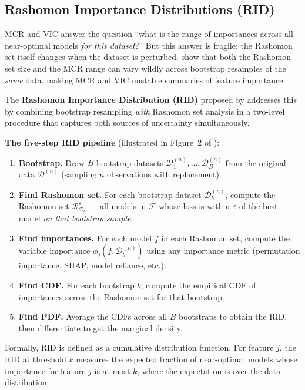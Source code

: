 \subsection{Rashomon Importance Distributions (RID)}
\label{sec:rashomon:rid}

MCR and VIC answer the question ``what is the range of importances across
all near-optimal models \emph{for this dataset}?''  But this answer is
fragile: the Rashomon set itself changes when the dataset is perturbed.
\citet{DonnellyEtAl2023} show that both the Rashomon set size and the MCR
range can vary wildly across bootstrap resamples of the \emph{same} data,
making MCR and VIC unstable summaries of feature importance.

The \textbf{Rashomon Importance Distribution (RID)} proposed by
\citet{DonnellyEtAl2023} addresses this by combining bootstrap resampling
\emph{with} Rashomon set analysis in a two-level procedure that captures
both sources of uncertainty simultaneously.

\textbf{The five-step RID pipeline} (illustrated in Figure~2 of
\citealt{DonnellyEtAl2023}):

\begin{enumerate}[leftmargin=1.8em]
  \item \textbf{Bootstrap.}  Draw $B$ bootstrap datasets
    $\mathcal{D}_1^{(n)}, \ldots, \mathcal{D}_B^{(n)}$ from the original
    data $\mathcal{D}^{(n)}$ (sampling $n$ observations with replacement).
  \item \textbf{Find Rashomon set.}  For each bootstrap dataset
    $\mathcal{D}_b^{(n)}$, compute the Rashomon set
    $\mathcal{R}_{\mathcal{D}_b}^{\varepsilon}$ --- all models in
    $\mathcal{F}$ whose loss is within $\varepsilon$ of the best model
    \emph{on that bootstrap sample}.
  \item \textbf{Find importances.}  For each model $f$ in each Rashomon
    set, compute the variable importance $\phi_j(f, \mathcal{D}_b^{(n)})$
    using any importance metric (permutation importance, SHAP, model
    reliance, etc.).
  \item \textbf{Find CDF.}  For each bootstrap $b$, compute the
    empirical CDF of importances across the Rashomon set for that bootstrap.
  \item \textbf{Find PDF.}  Average the CDFs across all $B$ bootstraps to
    obtain the RID, then differentiate to get the marginal density.
\end{enumerate}

Formally, RID is defined as a cumulative distribution function.  For
feature $j$, the RID at threshold $k$ measures the expected fraction of
near-optimal models whose importance for feature $j$ is at most $k$,
where the expectation is over the data distribution:

